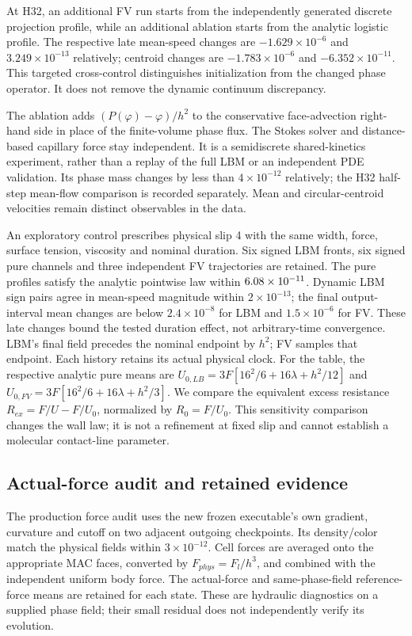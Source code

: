 At H32, an additional FV run starts from the independently generated
discrete projection profile, while an additional ablation starts from the
analytic logistic profile. The respective late mean-speed changes are
$-1.629\times10^{-6}$ and $3.249\times10^{-13}$ relatively; centroid
changes are $-1.783\times10^{-6}$ and $-6.352\times10^{-11}$.
This targeted cross-control distinguishes initialization from the changed
phase operator. It does not remove the dynamic continuum discrepancy.

The ablation adds $(P(\varphi)-\varphi)/h^2$ to the conservative
face-advection right-hand side in place of the finite-volume phase flux.
The Stokes solver and distance-based capillary force stay independent.
It is a semidiscrete shared-kinetics experiment, rather than a replay of
the full LBM or an independent PDE validation. Its phase mass changes
by less than $4\times10^{-12}$ relatively; the H32 half-step mean-flow
comparison is recorded separately. Mean and circular-centroid velocities
remain distinct observables in the data.

An exploratory control prescribes physical slip 4 with the same width,
force, surface tension, viscosity and nominal duration. Six signed LBM
fronts, six signed pure channels and three independent FV trajectories
are retained. The pure profiles satisfy the analytic pointwise law within
$6.08\times10^{-11}$. Dynamic LBM sign pairs agree in mean-speed
magnitude within $2\times10^{-13}$; the final output-interval mean changes
are below $2.4\times10^{-8}$ for LBM and $1.5\times10^{-6}$ for FV.
These late changes bound the tested duration effect, not arbitrary-time
convergence. LBM's final field precedes the nominal endpoint by $h^2$;
FV samples that endpoint. Each history retains its actual physical clock.
For the table, the respective analytic pure means are
$U_{0,LB}=3F[16^2/6+16\lambda+h^2/12]$ and
$U_{0,FV}=3F[16^2/6+16\lambda+h^2/3]$. We compare the equivalent excess
resistance $R_{ex}=F/U-F/U_0$, normalized by $R_0=F/U_0$.
This sensitivity comparison changes the wall law; it is not a refinement
at fixed slip and cannot establish a molecular contact-line parameter.



\subsection{Actual-force audit and retained evidence}
The production force audit uses the new frozen executable's own
gradient, curvature and cutoff on two adjacent outgoing checkpoints.
Its density/color match the physical fields within $3\times10^{-12}$.
Cell forces are averaged onto the appropriate MAC faces, converted by
$F_{phys}=F_l/h^3$, and combined with the independent uniform body force.
The actual-force and same-phase-field reference-force means are retained
for each state. These are hydraulic diagnostics on a supplied phase field;
their small residual does not independently verify its evolution.


